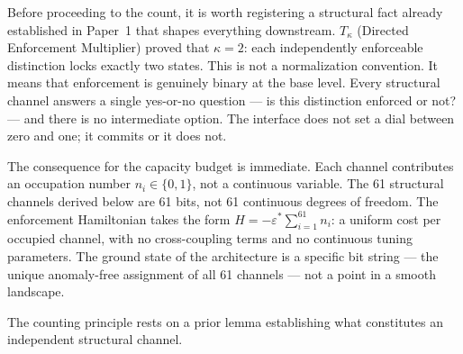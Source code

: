 \documentclass[11pt]{article}
\begin{document}
Before proceeding to the count, it is worth registering a structural fact already established in Paper~1 that shapes everything downstream.  $T_\kappa$ (Directed Enforcement Multiplier) proved that $\kappa = 2$: each independently enforceable distinction locks exactly two states.  This is not a normalization convention.  It means that enforcement is genuinely binary at the base level.  Every structural channel answers a single yes-or-no question --- is this distinction enforced or not? --- and there is no intermediate option.  The interface does not set a dial between zero and one; it commits or it does not.

The consequence for the capacity budget is immediate.  Each channel contributes an occupation number $n_i \in \{0,1\}$, not a continuous variable.  The 61 structural channels derived below are 61 bits, not 61 continuous degrees of freedom.  The enforcement Hamiltonian takes the form $H = -\varepsilon^* \sum_{i=1}^{61} n_i$: a uniform cost per occupied channel, with no cross-coupling terms and no continuous tuning parameters.  The ground state of the architecture is a specific bit string --- the unique anomaly-free assignment of all 61 channels --- not a point in a smooth landscape.

The counting principle rests on a prior lemma establishing what constitutes an independent structural channel.
\end{document}
